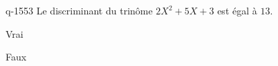 \begin{truefalse}{q-1553}
Le discriminant du trinôme $2X^2+5X+3$ est égal à $13$.
\item Vrai
\item* Faux
\end{truefalse}

